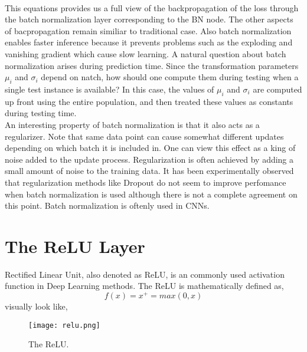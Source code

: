 \documentclass[11pt]{article}
\begin{document}
\\
This equations provides us a full view of the backpropagation of the loss through the batch normalization layer corresponding to the BN node. The other aspects of bacpropagation remain similiar to traditional case. Also batch normalization enables faster inference because it prevents problems such as the exploding and vanishing gradient which cause slow learning. A natural question about batch normalization arises during prediction time. Since the transformation parameters $\mu_i$ and $\sigma_i$ depend on natch, how should one compute them during testing when a single test instance is available? In this case, the values of $\mu_i$ and $\sigma_i$ are computed up front using the entire population, and then treated these values as constants during testing time. \\
An interesting property of batch normalization is that it also acts as a regularizer. Note that same data point can cause somewhat different updates depending on which batch it is included in. One can view this effect as a king of noise added to the update process. Regularization is often achieved by adding a small amount of noise to the training data. It has been experimentally observed that regularization methods like Dropout do not seem to improve perfomance when batch normalization is used although there is not a complete agreement on this point. Batch normalization is oftenly used in CNNs. 

\section{The ReLU Layer}
\hspace*{1cm} Rectified Linear Unit, also denoted as ReLU, is an commonly used activation function in Deep Learning methods. The ReLU is mathematically defined as, $$f(x) = x^+ = max(0,x)$$
visually look like,
\begin{figure}[H]
\centering
\texttt{[image: relu.png]}
\caption{The ReLU.}
\label{fig:figure3}
\end{figure}
\end{document}
